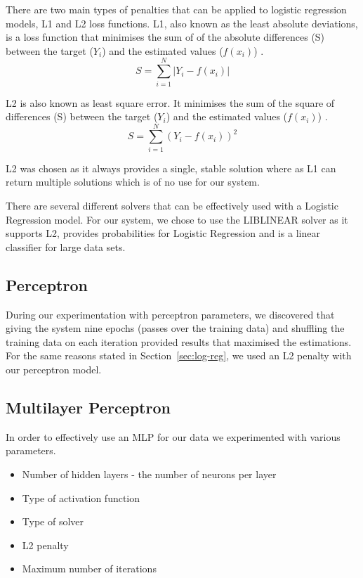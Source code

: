 \documentclass[bsc,frontabs,twoside,singlespacing,parskip,deptreport]{infthesis}     %
\begin{document}
 There are two main types of penalties that can be applied to logistic regression models, L1 and L2 loss functions.
 L1, also known as  the least absolute deviations, is a loss function that minimises the sum of of the absolute
 differences (S) between the target ($Y_i$) and the estimated values ($f(x_{i})$) \cite{l1l2}.
 \begin{equation}
   S = \sum_{i=1}^{N} | Y_i - f(x_i)|\nonumber
   \end{equation}
 
 L2 is also known as least square error. It minimises the sum of the square of differences (S) between
 the target ($Y_i$) and the estimated values ($f(x_{i})$) \cite{l1l2}.
 \begin{equation}
   S = \sum_{i=1}^{N} ( Y_i - f(x_i))^2\nonumber
   \end{equation}

 L2 was chosen as it always provides a single, stable solution where as L1 can return multiple solutions
 which is of no use for our system.

 There are several different solvers that can be effectively used with a Logistic Regression model.
 For our system, we chose to use the LIBLINEAR solver as it supports L2, provides probabilities
 for Logistic Regression and is a linear classifier for large data sets\cite{fan2008liblinear}.
 
 \subsection{Perceptron}
 During our experimentation with perceptron parameters, we discovered that giving the system nine epochs (passes
 over the training data) and shuffling the training data on each iteration provided results that maximised the
 estimations. For the same reasons stated in Section~\ref{sec:log-reg}, we used an L2 penalty with our perceptron
 model.
 
 \subsection{Multilayer Perceptron}
 In order to effectively use an MLP for our data we experimented with various parameters.
 \begin{itemize}
 \item Number of hidden layers - the number of neurons per layer
 \item Type of activation function
 \item Type of solver
 \item L2 penalty
 \item Maximum number of iterations
 \end{itemize}
 
\end{document}
